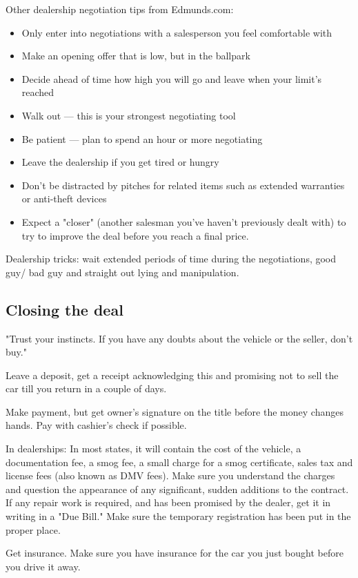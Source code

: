 \documentclass[oneside, article]{memoir}
\begin{document}
Other dealership negotiation tips from Edmunds.com:
\begin{itemize}
\item Only enter into negotiations with a salesperson you feel comfortable with
\item Make an opening offer that is low, but in the ballpark
\item Decide ahead of time how high you will go and leave when your limit's reached
\item Walk out — this is your strongest negotiating tool
\item Be patient — plan to spend an hour or more negotiating
\item Leave the dealership if you get tired or hungry
\item Don't be distracted by pitches for related items such as extended warranties or anti-theft devices
\item Expect a "closer" (another salesman you've haven't previously dealt with) to try to improve the deal before you reach a final price.
\end{itemize}

Dealership tricks: wait extended periods of time during the negotiations, good guy/ bad guy and straight out lying and manipulation.

\subsection{Closing the deal}

"Trust your instincts. If you have any doubts about the vehicle or the seller, don't buy."

Leave a deposit, get a receipt acknowledging this and promising not to sell the car till you return in a couple of days.

Make payment, but get owner's signature on the title before the money changes hands. Pay with cashier's check if possible.

In dealerships: In most states, it will contain the cost of the vehicle, a documentation fee, a smog fee, a small charge for a smog certificate, sales tax and license fees (also known as DMV fees). Make sure you understand the charges and question the appearance of any significant, sudden additions to the contract. If any repair work is required, and has been promised by the dealer, get it in writing in a "Due Bill." Make sure the temporary registration has been put in the proper place.

Get insurance. Make sure you have insurance for the car you just bought before you drive it away.
\end{document}
